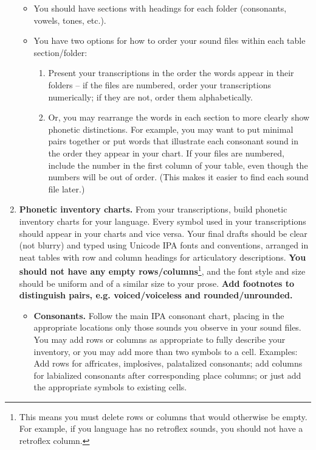 \documentclass[12pt, letterpaper]{article}
\begin{document}
\begin{enumerate}
\begin{itemize}
        \item You should have sections with headings for each folder (consonants, vowels, tones, etc.).
        \item You have two options for how to order your sound files within each table section/folder:
        \begin{enumerate}
            \item Present your transcriptions in the order the words appear in their folders – if the files are numbered, order your transcriptions numerically; if they are not, order them alphabetically.
            \item Or, you may rearrange the words in each section to more clearly show phonetic distinctions. For example, you may want to put minimal pairs together or put words that illustrate each consonant sound in the order they appear in your chart. If your files are numbered, include the number in the first column of your table, even though the numbers will be out of order. (This makes it easier to find each sound file later.)
        \end{enumerate} 
    \end{itemize}
    \item \textbf{Phonetic inventory charts.} From your transcriptions, build phonetic inventory charts for your language. Every symbol used in your transcriptions should appear in your charts and vice versa. Your final drafts should be clear (not blurry) and typed using Unicode IPA fonts and conventions, arranged in neat tables with row and column headings for articulatory descriptions. \textbf{You should not have any empty rows/columns}\footnote{This means you must delete rows or columns that would otherwise be empty. For example, if you language has no retroflex sounds, you should not have a retroflex column.}, and the font style and size should be uniform and of a similar size to your prose. \textbf{Add footnotes to distinguish pairs, e.g. voiced/voiceless and rounded/unrounded.}
    \begin{itemize}
        \item \textbf{Consonants.} Follow the main IPA consonant chart, placing in the appropriate locations only those sounds you observe in your sound files. You may add rows or columns as appropriate to fully describe your inventory, or you may add more than two symbols to a cell. Examples: Add rows for affricates, implosives, palatalized consonants; add columns for labialized consonants after corresponding place columns; or just add the appropriate symbols to existing cells.

\end{itemize}
\end{enumerate}
\end{document}
